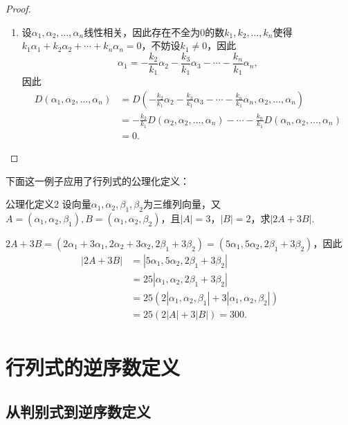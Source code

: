 \begin{proof}
\begin{enumerate}
        \item 设$\alpha_1,\alpha_2,\ldots,\alpha_n$线性相关，因此存在不全为0的数$k_1,k_2,\ldots,k_n$使得$k_1\alpha_1+k_2\alpha_2+\cdots+k_n\alpha_n=0$，不妨设$k_1 \neq 0$，因此
              \[\alpha_1=-\frac{k_2}{k_1}\alpha_2-\frac{k_3}{k_1}\alpha_3-\cdots-\frac{k_n}{k_1}\alpha_n,\]
              因此
              \begin{align*}
                  D(\alpha_1,\alpha_2,\ldots,\alpha_n) & =D(-\frac{k_2}{k_1}\alpha_2-\frac{k_3}{k_1}\alpha_3-\cdots-\frac{k_n}{k_1}\alpha_n,\alpha_2,\ldots,\alpha_n)     \\
                                                       & =-\frac{k_2}{k_1}D(\alpha_2,\alpha_2,\ldots,\alpha_n)-\cdots-\frac{k_n}{k_1}D(\alpha_n,\alpha_2,\ldots,\alpha_n) \\
                                                       & =0.
              \end{align*}
    \end{enumerate}
\end{proof}

下面这一例子应用了行列式的公理化定义：
\begin{example}{}{公理化定义2}
    设向量$\alpha_1,\alpha_2,\beta_1,\beta_2$为三维列向量，又$A=(\alpha_1,\alpha_2,\beta_1),B=(\alpha_1,\alpha_2,\beta_2)$，且$|A|=3$，$|B|=2$，求$|2A+3B|$.
\end{example}

\begin{solution}
    $2A+3B=(2\alpha_1+3\alpha_1,2\alpha_2+3\alpha_2,2\beta_1+3\beta_2)=(5\alpha_1,5\alpha_2,2\beta_1+3\beta_2)$，因此
    \begin{align*}
        |2A+3B| & =|5\alpha_1,5\alpha_2,2\beta_1+3\beta_2|                       \\
                & =25|\alpha_1,\alpha_2,2\beta_1+3\beta_2|                       \\
                & =25(2|\alpha_1,\alpha_2,\beta_1|+3|\alpha_1,\alpha_2,\beta_2|) \\
                & =25(2|A|+3|B|)=300.                                            \\
    \end{align*}
\end{solution}

\section{行列式的逆序数定义}

\subsection{从判别式到逆序数定义}

